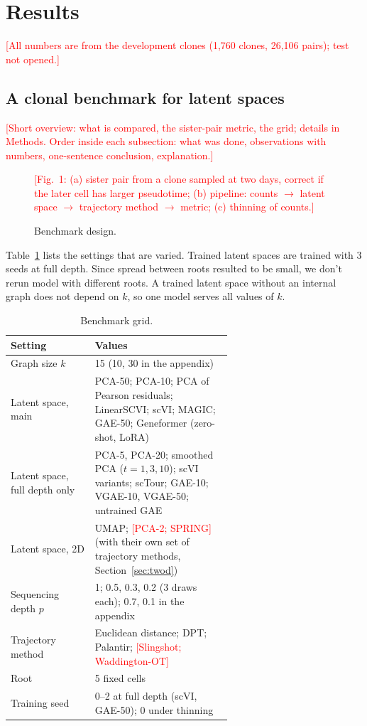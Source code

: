 \documentclass[10pt,a4paper,twocolumn]{article}
\newcommand{\todo}[1]{\textcolor{red}{[#1]}}
\begin{document}
\section{Results}
\todo{All numbers are from the development clones (1{,}760 clones, 26{,}106 pairs); test not opened.}

\subsection{A clonal benchmark for latent spaces}
\label{sec:overview}
\todo{Short overview: what is compared, the sister-pair metric, the grid; details in
Methods. Order inside each subsection: what was done, observations with numbers, one-sentence
conclusion, explanation.}

\begin{figure}[t]
\centering
\todo{Fig.~1: (a) sister pair from a clone sampled at two days, correct if the later cell has
larger pseudotime; (b) pipeline: counts $\to$ latent space $\to$ trajectory method $\to$ metric;
(c) thinning of counts.}
\caption{Benchmark design.}
\label{fig:design}
\end{figure}

Table~\ref{tab:grid} lists the settings that are varied. Trained latent spaces are trained with 3 seeds at full depth. Since spread
between roots resulted to be small, we don't rerun model with different roots. A trained latent space without
an internal graph does not depend on $k$, so one model serves all values of $k$.

\begin{table}[t]
\centering\small
\caption{Benchmark grid.}
\label{tab:grid}
\begin{tabular}{lp{0.62\linewidth}}
\toprule
Setting & Values \\
\midrule
Graph size $k$      & 15 (10, 30 in the appendix) \\
Latent space, main  & PCA-50; PCA-10; PCA of Pearson residuals; LinearSCVI; scVI; MAGIC;
                      GAE-50; Geneformer (zero-shot, LoRA) \\
Latent space, full depth only & PCA-5, PCA-20; smoothed PCA ($t = 1, 3, 10$); scVI variants;
                      scTour; GAE-10; VGAE-10, VGAE-50; untrained GAE \\
Latent space, 2D    & UMAP; \todo{PCA-2; SPRING} (with their own set of trajectory methods,
                      Section~\ref{sec:twod}) \\
Sequencing depth $p$ & 1; 0.5, 0.3, 0.2 (3 draws each); 0.7, 0.1 in the appendix \\
Trajectory method   & Euclidean distance; DPT; Palantir; \todo{Slingshot; Waddington-OT} \\
Root                & 5 fixed cells \\
Training seed       & 0--2 at full depth (scVI, GAE-50); 0 under thinning \\
\bottomrule
\end{tabular}
\end{table}
\end{document}
